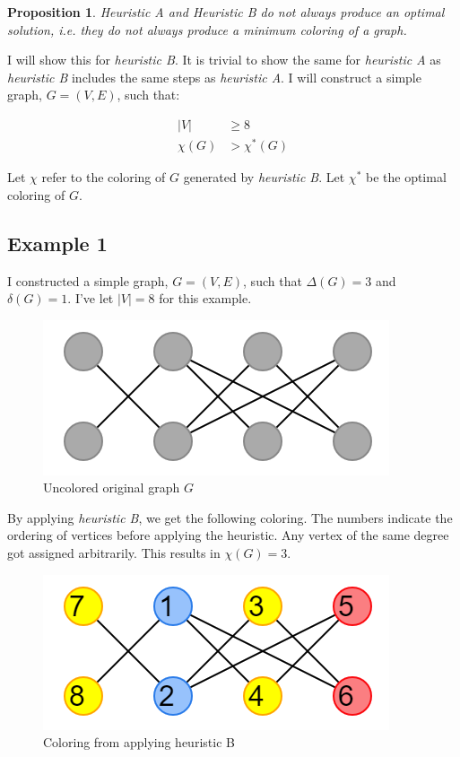 \documentclass{article}
\newtheorem{prop}{Proposition}
\theoremstyle{definition}
\begin{document}
\begin{prop}
Heuristic A and Heuristic B do not always produce an optimal solution, i.e. they do not always produce a minimum coloring of a graph.
\end{prop}

I will show this for \emph{heuristic B}. It is trivial to show the same for \emph{heuristic A} as \emph{heuristic B} includes the same steps as \emph{heuristic A}. I will construct a simple graph, \(G = (V, E)\), such that:

\begin{align}
|V| &\geq 8 \\
\chi(G) &> \chi^{*}(G)
\end{align}

Let \(\chi\) refer to the coloring of \(G\) generated by \emph{heuristic B}. Let \(\chi^{*}\) be the optimal coloring of \(G\).

\subsection*{Example 1}
I constructed a simple graph, \(G = (V, E)\), such that \(\Delta(G) = 3\) and \(\delta(G) = 1\). I've let \(|V| = 8\) for this example.

\begin{figure}[H]
\centering
\includegraphics[scale=0.6]{images/graph-1.png}
\caption{Uncolored original graph \(G\)}
\end{figure}

By applying \emph{heuristic B}, we get the following coloring. The numbers indicate the ordering of vertices before applying the heuristic. Any vertex of the same degree got assigned arbitrarily. This results in \(\chi(G) = 3\).

\begin{figure}[H]
\centering
\includegraphics[scale=0.6]{images/graph-2.png}
\caption{Coloring from applying heuristic B}
\end{figure}
\end{document}
